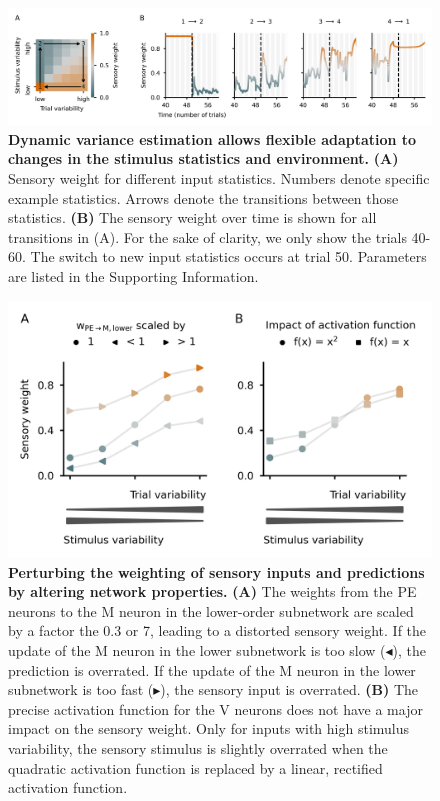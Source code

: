 \documentclass[10pt,a4paper]{article}
\begin{document}
\begin{figure}[!h]
	\centering
    \includegraphics{../results/figures/final/Fig_3_S1}%
\caption{\footnotesize{\bf Dynamic variance estimation allows flexible adaptation to changes in the stimulus statistics and environment. \newline}  
{\bf (A)} Sensory weight for different input statistics. Numbers denote specific example statistics. Arrows denote the transitions between those statistics.
{\bf (B)} The sensory weight over time is shown for all transitions in (A). For the sake of clarity, we only show the trials 40-60. The switch to new input statistics occurs at trial 50. Parameters are listed in the Supporting Information.
}
\label{fig:Fig_3_S1}
\end{figure}


\begin{figure}[!h]
	\centering
    \includegraphics{../results/figures/final/Fig_3_S2}%
\caption{\footnotesize{\bf Perturbing the weighting of sensory inputs and predictions by altering network properties. \newline}  
{\bf (A)} The weights from the PE neurons to the M neuron in the lower-order subnetwork are scaled by a factor the 0.3 or 7, leading to a distorted sensory weight. If the update of the M neuron in the lower subnetwork is too slow ($\blacktriangleleft$), the prediction is overrated. If the update of the M neuron in the lower subnetwork is too fast ($\blacktriangleright$), the sensory input is overrated.
{\bf (B)} The precise activation function for the V neurons does not have a major impact on the sensory weight. Only for inputs with high stimulus variability, the sensory stimulus is slightly overrated when the quadratic activation function is replaced by a linear, rectified activation function.
}
\label{fig:Fig_3_S2}
\end{figure}
\end{document}

